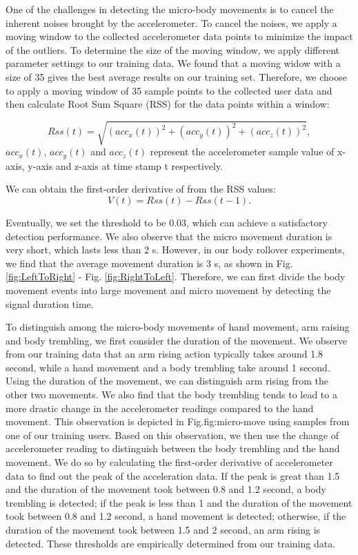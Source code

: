 One of the challenges in detecting the micro-body movements is to cancel the inherent noises brought by the accelerometer.
To cancel the noises, we apply a moving window to the collected accelerometer data points to minimize the impact of the outliers. To
determine the size of the moving window, we apply different parameter settings to our training data. We found that a moving widow with a
size of 35 gives the best average results on our training set. Therefore, we choose to apply a moving window of 35 sample points to the
collected user data and then calculate Root Sum Square (RSS) for the data points within a window:

\begin{equation}
      Rss(t) =\sqrt{(acc_x(t))^{2}+(acc_y(t))^{2}+(acc_z(t))^{2}},
\end{equation}
$acc_x(t)$, $acc_y(t)$ and $acc_z(t)$ represent the accelerometer sample value of x-axis, y-axis and z-axis at time stamp t respectively.


We can obtain the first-order derivative of from the RSS values:
\begin{equation}
      V(t)=Rss(t)-Rss(t-1).
\end{equation}

Eventually, we set the threshold to be 0.03, which can achieve a satisfactory detection performance. We also observe that the micro movement duration is very short, which lasts less than 2 s.
However, in our body rollover experiments, we find that the average movement duration is 3 s, as shown in Fig. \ref{fig:LeftToRight} - Fig. \ref{fig:RightToLeft}.
Therefore, we can first divide the body movement events into large movement and micro movement by detecting the signal duration time.

To distinguish among the micro-body movements of hand movement, arm raising and body trembling, we first consider the
duration of the movement. We observe from our training data that an arm rising action typically takes around 1.8 second, while a hand
movement and a body trembling take around 1 second. Using the duration of the movement, we can distinguish arm rising from the other two
movements. We also find that the body trembling tends to lead to a more drastic change in the accelerometer readings compared to the hand
movement. This observation is depicted in Fig.{fig:micro-move} using samples from one of our training users. Based on this observation, we
then use the change of accelerometer reading to distinguish between the body trembling and the hand movement. We do so by calculating the
first-order derivative of accelerometer data to find out the peak of the acceleration data.  If the peak is great than 1.5 and the duration
of the movement took between 0.8 and 1.2 second, a body trembling is detected; if the peak is less than 1 and the duration of the movement
took between 0.8 and 1.2 second, a hand movement is detected; otherwise, if the duration of the movement took between 1.5 and 2 second, an
arm rising is detected. These thresholds are empirically determined from our training data.

